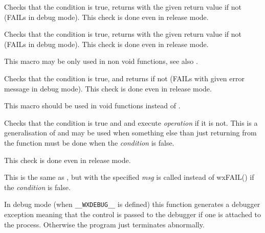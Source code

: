Checks that the condition is true, returns with the given return value if not (FAILs in debug mode).
This check is done even in release mode.

\label{wxcheckmsg}


Checks that the condition is true, returns with the given return value if not (FAILs in debug mode).
This check is done even in release mode.

This macro may be only used in non void functions, see also
.

\label{wxcheckret}


Checks that the condition is true, and returns if not (FAILs with given error
message in debug mode). This check is done even in release mode.

This macro should be used in void functions instead of
.

\label{wxcheck2}


Checks that the condition is true and  and execute
{\it operation} if it is not. This is a generalisation of
 and may be used when something else than just
returning from the function must be done when the {\it condition} is false.

This check is done even in release mode.

\label{wxcheck2msg}


This is the same as , but
 with the specified {\it msg} is called
instead of wxFAIL() if the {\it condition} is false.

\label{wxtrap}


In debug mode (when {\tt \_\_WXDEBUG\_\_} is defined) this function generates a
debugger exception meaning that the control is passed to the debugger if one is
attached to the process. Otherwise the program just terminates abnormally.

